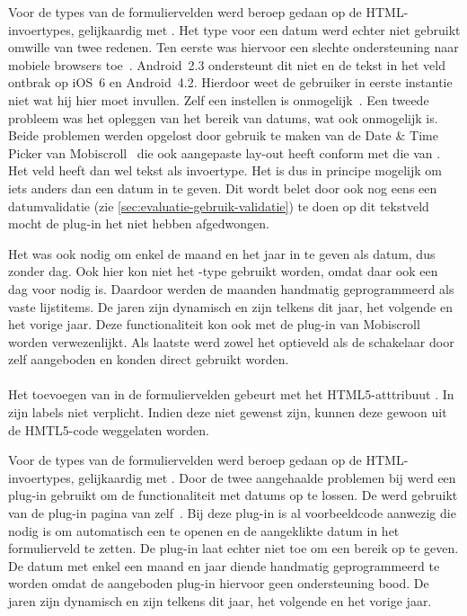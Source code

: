 Voor de types van de formuliervelden werd beroep gedaan op de HTML-invoertypes, gelijkaardig met \kendo{}.
Het type voor een datum werd echter niet gebruikt omwille van twee redenen.
Ten eerste was hiervoor een slechte ondersteuning naar mobiele browsers toe~\cite{Deveria2013c}.
Android~2.3 ondersteunt dit niet en de  tekst in het veld ontbrak op iOS~6 en Android~4.2.
Hierdoor weet de gebruiker in eerste instantie niet wat hij hier moet invullen. 
Zelf een  instellen is onmogelijk~\cite{Berjon2012}. 
Een tweede probleem was het opleggen van het bereik van datums, wat ook onmogelijk is. 
Beide problemen werden opgelost door gebruik te maken van de Date \& Time Picker van Mobiscroll~\cite{Mobiscroll2013} die ook aangepaste lay-out heeft conform met die van \jqm{}.
Het veld heeft dan wel tekst als invoertype.
Het is dus in principe mogelijk om iets anders dan een datum in te geven. 
Dit wordt belet door ook nog eens een datumvalidatie (zie \ref{sec:evaluatie-gebruik-validatie}) te doen op dit tekstveld mocht de plug-in het niet hebben afgedwongen.
 
Het was ook nodig om enkel de maand en het jaar in te geven als datum, dus zonder dag.
Ook hier kon niet het -type gebruikt worden, omdat daar ook een dag voor nodig is. 
Daardoor werden de maanden handmatig geprogrammeerd als vaste lijstitems. 
De jaren zijn dynamisch en zijn telkens dit jaar, het volgende en het vorige jaar. 
Deze functionaliteit kon ook met de plug-in van Mobiscroll worden verwezenlijkt.
Als laatste werd zowel het optieveld als de schakelaar door \jqm{} zelf aangeboden en konden direct gebruikt worden. 
 
\paragraph{\lungo} 
Het toevoegen van  in de formuliervelden gebeurt met het HTML5-atttribuut .
In \lungo{} zijn labels niet verplicht.
Indien deze niet gewenst zijn, kunnen deze gewoon uit de HMTL5-code weggelaten worden.

Voor de types van de formuliervelden werd beroep gedaan op de HTML-invoertypes, gelijkaardig met \kendo{}.
Door de twee aangehaalde problemen bij \jqm{} werd een plug-in gebruikt om de functionaliteit met datums op te lossen.
De  werd gebruikt van de plug-in pagina van \lungo{} zelf~\cite{TapQuo2013b}.
Bij deze plug-in is al voorbeeldcode aanwezig die nodig is om automatisch een  te openen en de aangeklikte datum in het formulierveld te zetten.
De plug-in laat echter niet toe om een bereik op te geven.
De datum met enkel een maand en jaar diende handmatig geprogrammeerd te worden omdat de aangeboden plug-in hiervoor geen ondersteuning bood.
De jaren zijn dynamisch en zijn telkens dit jaar, het volgende en het vorige jaar. 

